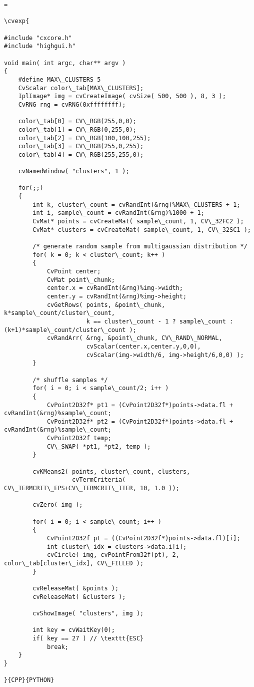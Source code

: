 \begin{verbatim}=

\cvexp{

#include "cxcore.h"
#include "highgui.h"

void main( int argc, char** argv )
{
    #define MAX\_CLUSTERS 5
    CvScalar color\_tab[MAX\_CLUSTERS];
    IplImage* img = cvCreateImage( cvSize( 500, 500 ), 8, 3 );
    CvRNG rng = cvRNG(0xffffffff);

    color\_tab[0] = CV\_RGB(255,0,0);
    color\_tab[1] = CV\_RGB(0,255,0);
    color\_tab[2] = CV\_RGB(100,100,255);
    color\_tab[3] = CV\_RGB(255,0,255);
    color\_tab[4] = CV\_RGB(255,255,0);

    cvNamedWindow( "clusters", 1 );

    for(;;)
    {
        int k, cluster\_count = cvRandInt(&rng)%MAX\_CLUSTERS + 1;
        int i, sample\_count = cvRandInt(&rng)%1000 + 1;
        CvMat* points = cvCreateMat( sample\_count, 1, CV\_32FC2 );
        CvMat* clusters = cvCreateMat( sample\_count, 1, CV\_32SC1 );

        /* generate random sample from multigaussian distribution */
        for( k = 0; k < cluster\_count; k++ )
        {
            CvPoint center;
            CvMat point\_chunk;
            center.x = cvRandInt(&rng)%img->width;
            center.y = cvRandInt(&rng)%img->height;
            cvGetRows( points, &point\_chunk, k*sample\_count/cluster\_count,
                       k == cluster\_count - 1 ? sample\_count : (k+1)*sample\_count/cluster\_count );
            cvRandArr( &rng, &point\_chunk, CV\_RAND\_NORMAL,
                       cvScalar(center.x,center.y,0,0),
                       cvScalar(img->width/6, img->height/6,0,0) );
        }

        /* shuffle samples */
        for( i = 0; i < sample\_count/2; i++ )
        {
            CvPoint2D32f* pt1 = (CvPoint2D32f*)points->data.fl + cvRandInt(&rng)%sample\_count;
            CvPoint2D32f* pt2 = (CvPoint2D32f*)points->data.fl + cvRandInt(&rng)%sample\_count;
            CvPoint2D32f temp;
            CV\_SWAP( *pt1, *pt2, temp );
        }

        cvKMeans2( points, cluster\_count, clusters,
                   cvTermCriteria( CV\_TERMCRIT\_EPS+CV\_TERMCRIT\_ITER, 10, 1.0 ));

        cvZero( img );

        for( i = 0; i < sample\_count; i++ )
        {
            CvPoint2D32f pt = ((CvPoint2D32f*)points->data.fl)[i];
            int cluster\_idx = clusters->data.i[i];
            cvCircle( img, cvPointFrom32f(pt), 2, color\_tab[cluster\_idx], CV\_FILLED );
        }

        cvReleaseMat( &points );
        cvReleaseMat( &clusters );

        cvShowImage( "clusters", img );

        int key = cvWaitKey(0);
        if( key == 27 ) // \texttt{ESC}
            break;
    }
}

}{CPP}{PYTHON}


\end{verbatim}

